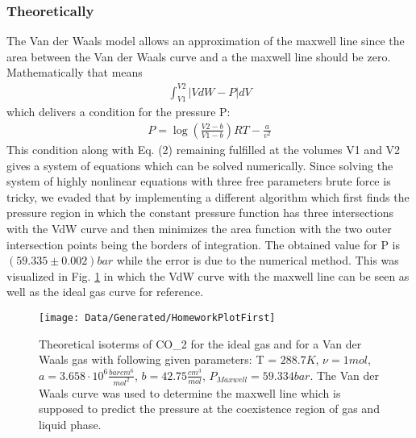 \documentclass[a4paper,10pt,twocolumn]{article}
\begin{document}
    \subsubsection{Theoretically}\label{subsubsec:maxwellFromTheory}
    The Van der Waals model allows an approximation of the maxwell line since the area between the Van der Waals curve and a the maxwell line should be zero.
    Mathematically that means
    \begin{align}
        \int_{V1}^{V2} |VdW - P| dV
        \end{align}
    which delivers a condition for the pressure P:
    \begin{align}
        P=\log(\frac{V2-b}{V1-b}) RT - \frac{a}{v^2}
    \end{align}
    This condition along with Eq. (2) remaining fulfilled at the volumes V1 and V2 gives a system of equations which can be solved numerically.
    Since solving the system of highly nonlinear equations with three free parameters brute force is tricky, we evaded that by implementing a different algorithm
    which first finds the pressure region in which the constant pressure function has three intersections with the VdW curve and then minimizes the area function
    with the two outer intersection points being the borders of integration.
    The obtained value for P is $(59.335\pm 0.002) bar$ while the error is due to the numerical method.
    This was visualized in Fig. \ref{fig:homeworkPlotOne} in which the VdW curve with the maxwell line can be seen as well as the ideal gas curve for reference.
    \begin{figure}
        \begin{center}
            \texttt{[image: Data/Generated/HomeworkPlotFirst]}
            \caption[]{Theoretical isoterms of CO_2\) for the ideal gas and for a Van der Waals gas with following given parameters:
            T = $288.7K$, $\nu=1 mol$, $a=3.658\cdot 10^6 \frac{bar cm^6}{mol^2}$, $b=42.75 \frac{cm^3}{mol}$, $P_{Maxwell}=59.334 bar$. The Van der Waals curve was used to
            determine the maxwell line which is supposed to predict the pressure at the coexistence region of gas and liquid phase.}
            \label{fig:homeworkPlotOne}
        \end{center}
    \end{figure}
    
\end{document}
